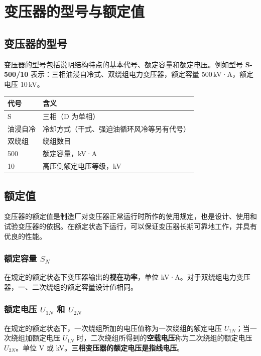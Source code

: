 
\section{变压器的型号与额定值}

\subsection{变压器的型号}
变压器的型号包括说明结构特点的基本代号、额定容量和额定电压。例如型号 \textbf{S-500/10} 表示：三相油浸自冷式、双绕组电力变压器，额定容量 500\,kV·A，额定电压 10\,kV。

\begin{center}
\begin{tabular}{@{}ll@{}}
\toprule
代号 & 含义 \\
\midrule
S & 三相（D 为单相） \\
油浸自冷 & 冷却方式（干式、强迫油循环风冷等另有代号） \\
双绕组 & 绕组数目 \\
500 & 额定容量，kV·A \\
10 & 高压侧额定电压等级，kV \\
\bottomrule
\end{tabular}
\end{center}

\subsection{额定值}
变压器的额定值是制造厂对变压器正常运行时所作的使用规定，也是设计、使用和试验变压器的依据。在额定状态下运行，可以保证变压器长期可靠地工作，并具有优良的性能。

\subsubsection{额定容量 $S_N$}
在规定的额定状态下变压器输出的\textbf{视在功率}，单位 kV·A。对于双绕组电力变压器，一、二次绕组的额定容量设计值相同。

\subsubsection{额定电压 $U_{1N}$ 和 $U_{2N}$}
在规定的额定状态下，一次绕组所加的电压值称为一次绕组的额定电压 $U_{1N}$；当一次绕组加额定电压 $U_{1N}$ 时，二次绕组所得到的\textbf{空载电压}称为二次绕组的额定电压 $U_{2N}$。单位 V 或 kV。\textbf{三相变压器的额定电压是指线电压}。

